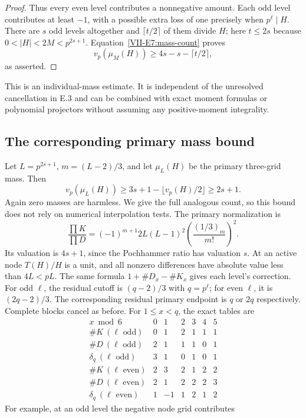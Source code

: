 \documentclass[11pt,letterpaper]{article}
\numberwithin{equation}{section}
\begin{document}
\begin{proof}
Thus every even level contributes a nonnegative amount. Each odd
level contributes at least $-1$, with a possible extra loss of one
precisely when $p^\ell\mid H$. There are $s$ odd levels altogether
and $\lceil t/2\rceil$ of them divide $H$; here $t\le2s$ because
$0<|H|<2M<p^{2s+1}$. Equation~\eqref{VII-E7:mass-count} proves
\[
 v_p(\mu_M(H))\ge4s-s-\lceil t/2\rceil,
\]
as asserted.
\end{proof}

This is an individual-mass estimate. It is independent of the unresolved
cancellation in E.3 and can be combined with exact moment formulas or
polynomial projectors without assuming any positive-moment integrality.

\subsection{The corresponding primary mass bound}
Let $L=p^{2s+1}$, $m=(L-2)/3$, and let $\mu_L(H)$ be the primary
three-grid mass. Then
\begin{equation}\label{VII-E7:primary-mass-bound}
 \boxed{v_p(\mu_L(H))\ge3s+1-\lfloor v_p(H)/2\rfloor\ge2s+1.}
\end{equation}
Again zero masses are harmless. We give the full analogous count,
so this bound does not rely on numerical interpolation tests.
The primary normalization is
\[
 \frac{\prod K}{\prod D}
 =(-1)^{m+1}2L(L-1)^2\left(\frac{(1/3)_m}{m!}\right)^2.
\]
Its valuation is $4s+1$, since the Pochhammer ratio has valuation $s$.
At an active node $T(H)/H$ is a unit, and all nonzero differences
have absolute value less than $4L<pL$.
The same formula $1+\#D_x-\#K_x$ gives each level's correction.
For odd $\ell$, the residual cutoff is $(q-2)/3$ with $q=p^\ell$;
for even $\ell$, it is $(2q-2)/3$. The corresponding residual primary
endpoint is $q$ or $2q$ respectively. Complete blocks cancel as before.
For $1\le x<q$, the exact tables are
\[
\begin{array}{c|rrrrrr}
x\bmod6&0&1&2&3&4&5\\\hline
\#K\ (\ell\text{ odd})&0&1&2&1&1&1\\
\#D\ (\ell\text{ odd})&2&1&1&1&0&1\\
\delta_q\ (\ell\text{ odd})&3&1&0&1&0&1\\\hline
\#K\ (\ell\text{ even})&2&3&2&1&2&2\\
\#D\ (\ell\text{ even})&2&1&2&2&2&3\\
\delta_q\ (\ell\text{ even})&1&-1&1&2&1&2
\end{array}
\]
For example, at an odd level the negative node grid contributes
\end{document}

